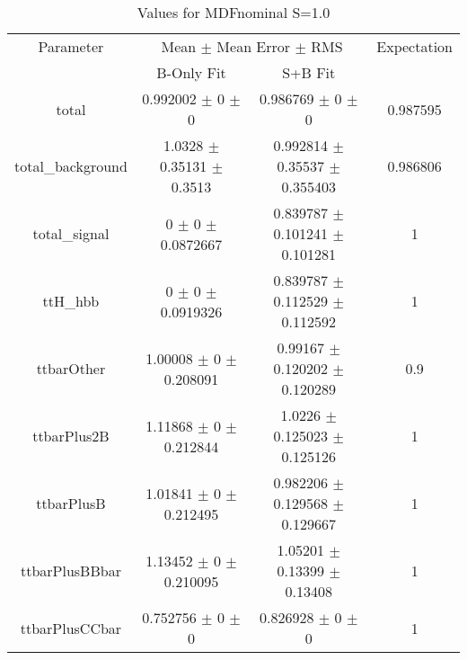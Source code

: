 \begin{table}
\centering
\caption{Values for MDFnominal S=1.0}
\begin{tabular}{cccc}
\toprule
Parameter & \multicolumn{2}{c}{Mean $\pm$ Mean Error $\pm$ RMS} & Expectation\\
 & B-Only Fit & S+B Fit & \\
\midrule
total & \num{0.992002} $\pm$ \num{0} $\pm$ \num{0} & \num{0.986769} $\pm$ \num{0} $\pm$ \num{0} & \num{0.987595}\\
total\_background & \num{1.0328} $\pm$ \num{0.35131} $\pm$ \num{0.3513} & \num{0.992814} $\pm$ \num{0.35537} $\pm$ \num{0.355403} & \num{0.986806}\\
total\_signal & \num{0} $\pm$ \num{0} $\pm$ \num{0.0872667} & \num{0.839787} $\pm$ \num{0.101241} $\pm$ \num{0.101281} & \num{1}\\
ttH\_hbb & \num{0} $\pm$ \num{0} $\pm$ \num{0.0919326} & \num{0.839787} $\pm$ \num{0.112529} $\pm$ \num{0.112592} & \num{1}\\
ttbarOther & \num{1.00008} $\pm$ \num{0} $\pm$ \num{0.208091} & \num{0.99167} $\pm$ \num{0.120202} $\pm$ \num{0.120289} & \num{0.9}\\
ttbarPlus2B & \num{1.11868} $\pm$ \num{0} $\pm$ \num{0.212844} & \num{1.0226} $\pm$ \num{0.125023} $\pm$ \num{0.125126} & \num{1}\\
ttbarPlusB & \num{1.01841} $\pm$ \num{0} $\pm$ \num{0.212495} & \num{0.982206} $\pm$ \num{0.129568} $\pm$ \num{0.129667} & \num{1}\\
ttbarPlusBBbar & \num{1.13452} $\pm$ \num{0} $\pm$ \num{0.210095} & \num{1.05201} $\pm$ \num{0.13399} $\pm$ \num{0.13408} & \num{1}\\
ttbarPlusCCbar & \num{0.752756} $\pm$ \num{0} $\pm$ \num{0} & \num{0.826928} $\pm$ \num{0} $\pm$ \num{0} & \num{1}\\
\bottomrule
\end{tabular}
\end{table}